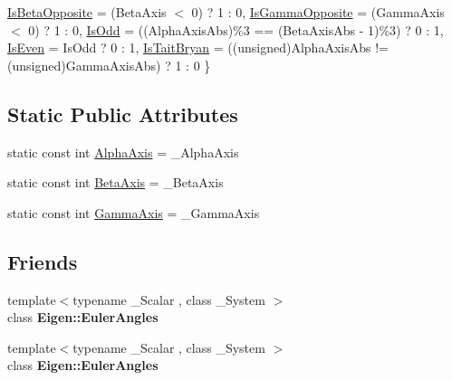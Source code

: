 \begin{DoxyCompactItemize}
\newline
\hyperlink{class_eigen_1_1_euler_system_ab1604e0e8eb9b72fa937236fdb9fd68da659596aeadc17ade7dff5b8740c04ca8}{Is\+Beta\+Opposite} = (Beta\+Axis $<$ 0) ? 1 \+: 0, 
\hyperlink{class_eigen_1_1_euler_system_ab1604e0e8eb9b72fa937236fdb9fd68da6779029ac21bd5102818c8ea8cf6c031}{Is\+Gamma\+Opposite} = (Gamma\+Axis $<$ 0) ? 1 \+: 0, 
\hyperlink{class_eigen_1_1_euler_system_ab1604e0e8eb9b72fa937236fdb9fd68da43734e3026d24162637bd4b09309529f}{Is\+Odd} = ((Alpha\+Axis\+Abs)\%3 == (Beta\+Axis\+Abs -\/ 1)\%3) ? 0 \+: 1, 
\hyperlink{class_eigen_1_1_euler_system_ab1604e0e8eb9b72fa937236fdb9fd68da7d962970ece2524efb5aa4317d89c17c}{Is\+Even} = Is\+Odd ? 0 \+: 1, 
\newline
\hyperlink{class_eigen_1_1_euler_system_ab1604e0e8eb9b72fa937236fdb9fd68dae4c717ae02bcec9247f5ef7d2d5d91fa}{Is\+Tait\+Bryan} = ((unsigned)Alpha\+Axis\+Abs != (unsigned)Gamma\+Axis\+Abs) ? 1 \+: 0
 \}
\end{DoxyCompactItemize}
\subsection*{Static Public Attributes}
\begin{DoxyCompactItemize}
\item 
static const int \hyperlink{class_eigen_1_1_euler_system_a9a34f6b38d6ca01d5f1ad3e392403e8e}{Alpha\+Axis} = \+\_\+\+Alpha\+Axis
\item 
static const int \hyperlink{class_eigen_1_1_euler_system_ae350fd346a9ed3c1b03ba1bcf0316ffa}{Beta\+Axis} = \+\_\+\+Beta\+Axis
\item 
static const int \hyperlink{class_eigen_1_1_euler_system_ad734a405b0a7a9bb6e3faf41a0280adf}{Gamma\+Axis} = \+\_\+\+Gamma\+Axis
\end{DoxyCompactItemize}
\subsection*{Friends}
\begin{DoxyCompactItemize}
\item 
\mbox{\label{class_eigen_1_1_euler_system_aaed3d87b19518ded2654aa3664123324}} 
{\footnotesize template$<$typename \+\_\+\+Scalar , class \+\_\+\+System $>$ }\\class {\bfseries Eigen\+::\+Euler\+Angles}
\item 
\mbox{\label{class_eigen_1_1_euler_system_a4edbfd80991b5318999dfd5bb29f9e9f}} 
{\footnotesize template$<$typename \+\_\+\+Scalar , class \+\_\+\+System $>$ }\\class {\bfseries Eigen\+::\+Euler\+Angles}
\end{DoxyCompactItemize}


